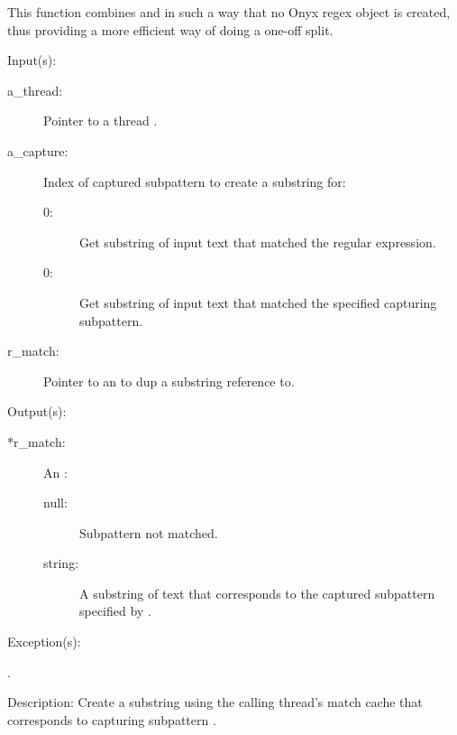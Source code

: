 \begin{capi}
\begin{capilist}
		This function combines  and
		 in such a way that no Onyx regex
		object is created, thus providing a more efficient way of doing
		a one-off split.
	\end{capilist}
\label{nxo_regex_submatch}
	\begin{capilist}
	\item[Input(s): ]
		\begin{description}\item[]
		\item[a\_thread: ]
			Pointer to a thread .
		\item[a\_capture: ]
			Index of captured subpattern to create a substring for:
			\begin{description}\item[]
			\item[0: ]
				Get substring of input text that matched the
				regular expression.
			\item[{\gt}0: ]
				Get substring of input text that matched the
				specified capturing subpattern.
			\end{description}
		\item[r\_match: ]
			Pointer to an  to dup a substring
			reference to.
		\end{description}
	\item[Output(s): ]
		\begin{description}\item[]
		\item[*r\_match: ]
			An :
			\begin{description}\item[]
			\item[null: ] Subpattern not matched.
			\item[string: ]
				A substring of text that corresponds to
				the captured subpattern specified by
				.
			\end{description}
		\end{description}
	\item[Exception(s): ]
		\begin{description}\item[]
		\item[.]
		\end{description}
	\item[Description: ]
		Create a substring using the calling thread's match cache that
		corresponds to capturing subpattern .


\end{capilist}
\end{capi}
